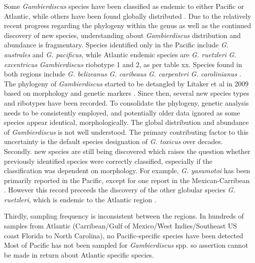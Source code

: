 \documentclass[12pt]{article}
\begin{document}
Some \emph{Gambierdiscus} species have been classified as endemic to either Pacific or Atlantic, while others have been found globally distributed \cite{berdalet2012global,litaker2010global}. Due to the relatively recent progress regarding the phylogeny within the genus as well as the continued discovery of new species, understanding about \emph{Gambierdiscus} distribution and abundance is fragmentary.
Species identified only in the Pacific include \emph{G. australes} and \emph{G. pacificus}, while Atlantic endemic species are \emph{G. ruetzleri} \emph{G. excentricus} \emph{Gambierdiscus} riobotype 1 and 2, as per table xx. Species found in both regions include \emph{G. belizeanus} \emph{G. caribeaus} \emph{G. carpenteri} \emph{G. carolinianus} \cite{litaker2010global,litaker2009taxonomy,berdalet2012global}. %
The phylogeny of \emph{Gambierdiscus} started to be detangled by Litaker et al in 2009 based on morphology and genetic markers \cite{litaker2009taxonomy}. Since then, several new species types and ribotypes have been recorded. To consolidate the phylogeny, genetic analysis needs to be consistently employed, and potentially older data ignored as some species appear identical, morphologically.
The global distribution and abundance of \emph{Gambierdiscus} is not well understood. The primary contributing factor to this uncertainty is the default species designation of \emph{G. toxicus} over decades. Secondly. new species are still being discovered which raises the question whether previously identified species were correctly classified, especially if the classification was dependent on morphology.
For example, \emph{G. yasumotoi} has been primarily reported in the Pacific, except for one report in the Mexican-Carribean \cite{hernandez2004species}. However this record preceeds the discovery of the other globular species \emph{G. ruetzleri}, which is endemic to the Atlantic region \cite{litaker2009taxonomy}.
     
Thirdly, sampling frequency is inconsistent between the regions. In hundreds of samples from Atlantic (Carribean/Gulf of Mexico/West Indies/Southeast US coast Florida to North Carolina), no Pacific-specific species have been detected \cite{berdalet2012global,litaker2010global} Most of Pacific has not been sampled for \emph{Gambierdiscus} spp. so assertion cannot be made in return about Atlantic specific species.
\end{document}
